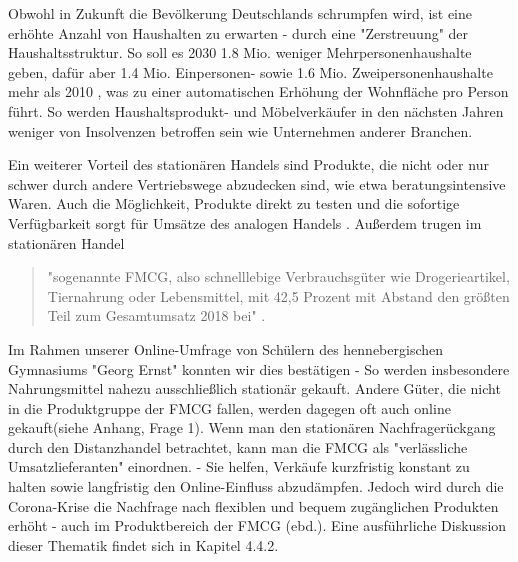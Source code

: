 \documentclass[a4paper, 12pt]{scrartcl}
\makeatletter
\newenvironment{folding}{\endgroup}{\begingroup \def \@currenvir{folding}\edef \@currenvline{\on@line}}
\makeatother
\begin{document}
\begin{folding}
Obwohl in Zukunft die Bevölkerung Deutschlands schrumpfen wird, ist eine erhöhte Anzahl von Haushalten zu erwarten - durch eine "Zerstreuung" der Haushaltsstruktur. So soll es 2030 1.8 Mio. weniger Mehrpersonenhaushalte geben, dafür aber 1.4 Mio. Einpersonen- sowie 1.6 Mio. Zweipersonenhaushalte mehr als 2010 \cite[S. 35]{Nitt}, was zu einer automatischen Erhöhung der Wohnfläche pro Person führt. So werden Haushaltsprodukt- und Möbelverkäufer in den nächsten Jahren weniger von Insolvenzen betroffen sein wie Unternehmen anderer Branchen.

Ein weiterer Vorteil des stationären Handels sind Produkte, die nicht oder nur schwer durch andere Vertriebswege abzudecken sind, wie etwa beratungsintensive Waren. Auch die Möglichkeit, Produkte direkt zu testen und die sofortige Verfügbarkeit sorgt für Umsätze des analogen Handels \cite[S. 2]{Maier}. Außerdem trugen im stationären Handel
\begin{quote}
 "sogenannte \ac{FMCG}, also schnelllebige Verbrauchsgüter wie   Drogerieartikel,   Tiernahrung   oder   Lebensmittel,   mit 42,5 Prozent mit Abstand den größten Teil zum Gesamtumsatz 2018 bei" \cite{corona-schub}.
\end{quote}

\noindent Im Rahmen unserer Online-Umfrage von Schülern des hennebergischen Gymnasiums "Georg Ernst" konnten wir dies  bestätigen - So werden insbesondere Nahrungsmittel nahezu ausschließlich stationär gekauft. Andere Güter, die nicht in die Produktgruppe der \ac{FMCG} fallen, werden dagegen oft auch online gekauft(siehe Anhang, Frage 1). Wenn man den stationären Nachfragerückgang durch den Distanzhandel betrachtet, kann man die \ac{FMCG} als "verlässliche Umsatzlieferanten" einordnen. - Sie helfen, Verkäufe kurzfristig konstant zu halten sowie langfristig den Online-Einfluss abzudämpfen. Jedoch wird durch die Corona-Krise die Nachfrage nach flexiblen und bequem zugänglichen Produkten erhöht - auch im Produktbereich der \ac{FMCG} (ebd.). Eine ausführliche Diskussion dieser Thematik findet sich in Kapitel 4.4.2.


\end{folding}
\end{document}
